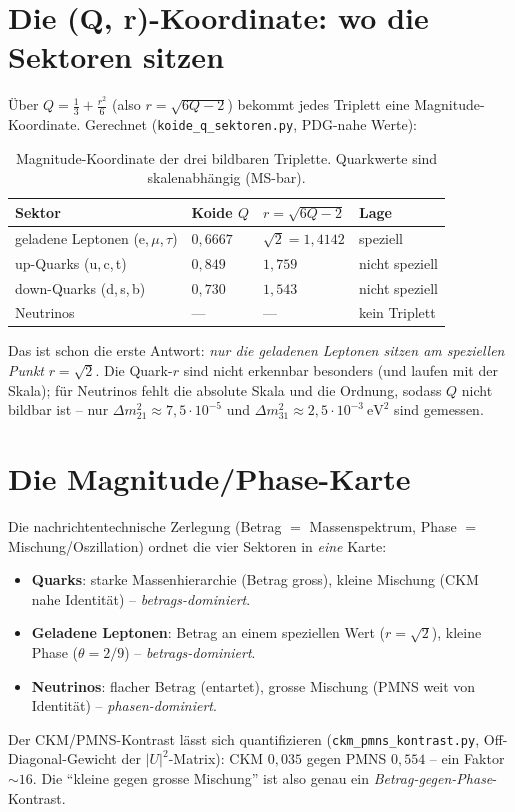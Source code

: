 \section{Die (Q, r)-Koordinate: wo die Sektoren sitzen}
Über $Q=\tfrac13+\tfrac{r^2}{6}$ (also $r=\sqrt{6Q-2}$) bekommt jedes Triplett eine
Magnitude-Koordinate. Gerechnet (\texttt{koide\_q\_sektoren.py}, PDG-nahe Werte):

\begin{table}[htbp]
\centering
\caption{Magnitude-Koordinate der drei bildbaren Triplette. Quarkwerte sind skalenabhängig (MS-bar).}
\label{tab:qr}
\begin{tabular}{p{5.2cm}p{2.2cm}p{2.4cm}p{2.6cm}}
\toprule
\textbf{Sektor} & \textbf{Koide $Q$} & \textbf{$r=\sqrt{6Q-2}$} & \textbf{Lage} \\
\midrule
geladene Leptonen (e,\,$\mu$,\,$\tau$) & $0{,}6667$ & $\sqrt2=1{,}4142$ & speziell \\
up-Quarks (u,\,c,\,t)                  & $0{,}849$  & $1{,}759$         & nicht speziell \\
down-Quarks (d,\,s,\,b)                & $0{,}730$  & $1{,}543$         & nicht speziell \\
Neutrinos                              & ---        & ---               & kein Triplett \\
\bottomrule
\end{tabular}
\end{table}

Das ist schon die erste Antwort: \emph{nur die geladenen Leptonen sitzen am speziellen Punkt}
$r=\sqrt2$. Die Quark-$r$ sind nicht erkennbar besonders (und laufen mit der Skala); für Neutrinos
fehlt die absolute Skala und die Ordnung, sodass $Q$ nicht bildbar ist -- nur $\Delta m^2_{21}\approx
7{,}5\cdot10^{-5}$ und $\Delta m^2_{31}\approx2{,}5\cdot10^{-3}~\mathrm{eV}^2$ sind gemessen.

\section{Die Magnitude/Phase-Karte}
Die nachrichtentechnische Zerlegung (Betrag $=$ Massenspektrum, Phase $=$ Mischung/Oszillation) ordnet
die vier Sektoren in \emph{eine} Karte:
\begin{itemize}
  \item \textbf{Quarks}: starke Massenhierarchie (Betrag gross), kleine Mischung (CKM nahe Identität)
        -- \emph{betrags-dominiert}.
  \item \textbf{Geladene Leptonen}: Betrag an einem speziellen Wert ($r=\sqrt2$), kleine Phase
        ($\theta=2/9$) -- \emph{betrags-dominiert}.
  \item \textbf{Neutrinos}: flacher Betrag (entartet), grosse Mischung (PMNS weit von Identität)
        -- \emph{phasen-dominiert}.
\end{itemize}
Der CKM/PMNS-Kontrast lässt sich quantifizieren (\texttt{ckm\_pmns\_kontrast.py}, Off-Diagonal-Gewicht
der $|U|^2$-Matrix): CKM $0{,}035$ gegen PMNS $0{,}554$ -- ein Faktor $\sim16$. Die \enquote{kleine
gegen grosse Mischung} ist also genau ein \emph{Betrag-gegen-Phase}-Kontrast.

